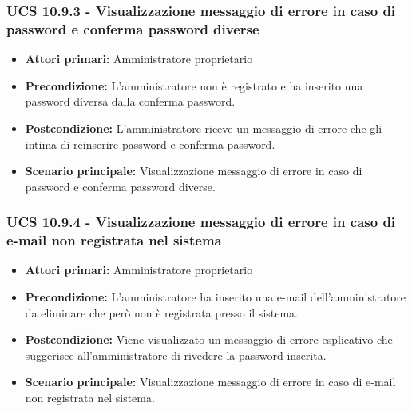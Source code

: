 \subsubsection{UCS 10.9.3 - Visualizzazione messaggio di errore in caso di password e conferma password diverse}%
\begin{itemize}
	\item \textbf{Attori primari:} Amministratore proprietario
	\item \textbf{Precondizione:} L'amministratore non è registrato e ha inserito una password diversa dalla conferma password.
	\item \textbf{Postcondizione:} L'amministratore riceve un messaggio di errore che gli intima di reinserire password e conferma password.
	\item \textbf{Scenario principale:} Visualizzazione messaggio di errore in caso di password e conferma password diverse.
\end{itemize}

\subsubsection{UCS 10.9.4 - Visualizzazione messaggio di errore in caso di e-mail non registrata nel sistema}%
\begin{itemize}
	\item \textbf{Attori primari:} Amministratore proprietario
	\item \textbf{Precondizione:} L'amministratore ha inserito una e-mail dell'amministratore da eliminare che però non è registrata presso il sistema.
	\item \textbf{Postcondizione:} Viene visualizzato un messaggio di errore esplicativo che suggerisce all'amministratore di rivedere la password inserita.
	\item \textbf{Scenario principale:} Visualizzazione messaggio di errore in caso di e-mail non registrata nel sistema.
\end{itemize}